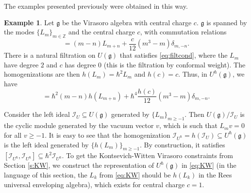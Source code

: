 \documentclass[reqno,oneside,11pt]{amsart}
\theoremstyle{plain}
\theoremstyle{definition}
\newtheorem{example}[theorem]{Example}
\theoremstyle{remark}
\numberwithin{equation}{section}
\begin{document}
The examples presented previously were obtained in this way.

\begin{example}
Let $\mathfrak{g}$ be the Virasoro algebra with central charge $c$. $\mathfrak{g}$ is spanned by the modes $\{L_m \}_{m \in \mathbb{Z}}$ and the central charge $c$, with commutation relations
\begin{equation}
[L_m, L_n ] = (m-n) L_{m+n} + \frac{c}{12}(m^3-m) \delta_{m,-n}.
\end{equation}
There is a natural filtration on $U(\mathfrak{g})$ that satisfies \eqref{eq:filtcond}, where the $L_m$ have degree $2$ and $c$  has degree $0$ (this is the filtration by conformal weight). The homogenizations are then $h(L_m) = \hbar^2 L_m$ and $h(c) = c$. Thus, in $U^\hbar(\mathfrak{g})$, we have
\begin{equation}
[h(L_m), h(L_n)] = \hbar^2 (m-n) h(L_{m+n}) + \hbar^4 \frac{h(c)}{12}(m^3-m) \delta_{m,-n}.
\end{equation}

Consider the left ideal $\mathcal{I}_U \subseteq U(\mathfrak{g})$ generated by $\{L_m\}_{m \geq -1}$. Then $U(\mathfrak{g})/\mathcal{I}_U$ is the cyclic module generated by the vacuum vector $v$, which is such that $L_m v = 0$ for all $v \geq -1$. It is easy to see that the homogenization $\mathcal{I}_{U^\hbar} = h(\mathcal{I}_U) \subseteq U^\hbar(\mathfrak{g})$ is the left ideal generated by $\{h(L_m)\}_{m \geq -1}$. By construction, it satisfies $[\mathcal{I}_{U^\hbar}, \mathcal{I}_{U^\hbar}] \subseteq \hbar^2 \mathcal{I}_{U^\hbar}$. To get the Kontsevich-Witten Virasoro constraints from Section \ref{s:KW}, we construct the representation of $U^\hbar(\mathfrak{g})$ in \eqref{eq:KW} (in the language of this section, the $L_k$ from \eqref{eq:KW} should be $h(L_k)$ in the Rees universal enveloping algebra), which exists for central charge $c=1$.
\end{example}
\end{document}
